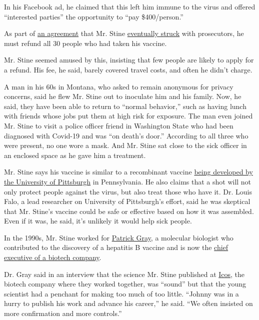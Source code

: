 In his Facebook ad, he claimed that this left him immune to the virus
and offered ``interested parties'' the opportunity to ``pay
\$400/person.''

As part of
\href{https://agportal-s3bucket.s3.amazonaws.com/2020_06_22ConsentDecree.pdf}{an
agreement} that Mr. Stine
\href{https://www.atg.wa.gov/news/news-releases/ag-ferguson-wins-refunds-victims-covid-19-vaccine-scam}{eventually
struck} with prosecutors, he must refund all 30 people who had taken his
vaccine.

Mr. Stine seemed amused by this, insisting that few people are likely to
apply for a refund. His fee, he said, barely covered travel costs, and
often he didn't charge.

A man in his 60s in Montana, who asked to remain anonymous for privacy
concerns, said he flew Mr. Stine out to inoculate him and his family.
Now, he said, they have been able to return to ``normal behavior,'' such
as having lunch with friends whose jobs put them at high risk for
exposure. The man even joined Mr. Stine to visit a police officer friend
in Washington State who had been diagnosed with Covid-19 and was ``on
death's door.'' According to all three who were present, no one wore a
mask. And Mr. Stine sat close to the sick officer in an enclosed space
as he gave him a treatment.

Mr. Stine says his vaccine is similar to a recombinant vaccine
\href{https://www.sciencedaily.com/releases/2020/04/200402144508.htm}{being
developed by the University of Pittsburgh} in Pennsylvania. He also
claims that a shot will not only protect people against the virus, but
also treat those who have it. Dr. Louis Falo, a lead researcher on
University of Pittsburgh's effort, said he was skeptical that Mr.
Stine's vaccine could be safe or effective based on how it was
assembled. Even if it was, he said, it's unlikely it would help sick
people.

In the 1990s, Mr. Stine worked for
\href{https://www.pascalbiosciences.com/company/}{Patrick Gray}, a
molecular biologist who contributed to the discovery of a hepatitis B
vaccine and is now the
\href{https://www.pascalbiosciences.com/company/}{chief executive of a
biotech company}.

Dr. Gray said in an interview that the science Mr. Stine published at
\href{https://xconomy.com/seattle/2009/11/18/the-icos-alumni-where-are-they-now/}{Icos},
the biotech company where they worked together, was ``sound'' but that
the young scientist had a penchant for making too much of too little.
``Johnny was in a hurry to publish his work and advance his career,'' he
said. ``We often insisted on more confirmation and more controls.''

